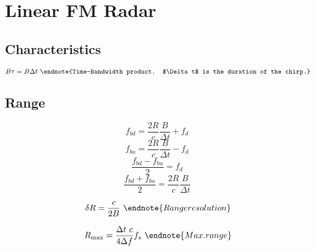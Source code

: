 \section{Linear FM Radar}

\subsection{Characteristics}
\begin{multicols}{3} \noindent
	$$ B \tau = B \Delta t \
		\endnote{Time-Bandwidth product. $\Delta t$ is the duration of the chirp.}
		$$
\end{multicols}

\subsection{Range}
\begin{multicols}{3} \noindent
	$$ f_{bd} = \frac{2R}{c} \frac{B}{\Delta t} + f_d \
		$$
	$$ f_{bu} = \frac{2R}{c} \frac{B}{\Delta t} - f_d \
		$$
	$$ \frac{f_{bd} - f_{bu}}{2} = f_d \
		$$
	$$ \frac{f_{bd} + f_{bu}}{2} = \frac{2R}{c} \frac{B}{\Delta t}\
		$$

	$$ \delta R = \frac{c}{2B} \
		\endnote{Range resolution}
		$$

	$$ R_\text{max} = \frac{\Delta t \ c}{4 \Delta f} f_s \
		\endnote{Max. range}
		$$

\end{multicols}


\printendnotes[itemize]
